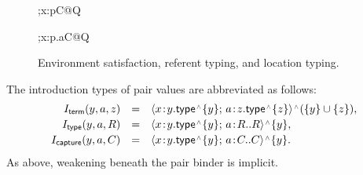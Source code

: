 \documentclass[acmsmall,screen,nonacm]{acmart}
\begin{document}
\begin{figure}[H]
\begin{minipage}[t]{0.51\linewidth}
  {\Omega;\sigma\models x:\sing p\capt C@Q}

  {\Omega;\sigma\models x:p.a\capt C@Q}
\end{minipage}

\caption{Environment satisfaction, referent typing, and location typing.}
\label{fig:store-typing-relations}
\end{figure}

\endgroup

The introduction types of pair values are abbreviated as follows:
\[
\begin{array}{rcl}
I_{\mathsf{term}}(y,a,z)
 &=& \pairshape{x}{\sing y\capt\set y}{a}
    {\sing z\capt\set z}
   \capt(\set y\cup\set z),
\\[2pt]
I_{\mathsf{type}}(y,a,R)
 &=& \pairshape{x}{\sing y\capt\set y}{a}
    {R..R}
   \capt\set y,
\\[2pt]
I_{\mathsf{capture}}(y,a,C)
 &=& \pairshape{x}{\sing y\capt\set y}{a}
    {C..C}
   \capt\set y.
\end{array}
\]
As above, weakening beneath the pair binder is implicit.

\begingroup
\setlength{\abovedisplayskip}{5pt plus 1pt minus 1pt}
\setlength{\belowdisplayskip}{5pt plus 1pt minus 1pt}
\setlength{\intextsep}{5pt}
\captionsetup{skip=6pt}
\end{document}
